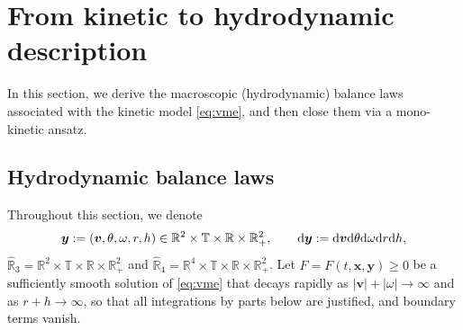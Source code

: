 \documentclass[a4paper,11pt]{article}
\numberwithin{equation}{section}
\theoremstyle{definition}
\newcommand{\bfx}{\boldsymbol{x}}
\newcommand{\bfy}{\boldsymbol{y}}
\newcommand{\bfv}{\boldsymbol{v}}
\newcommand{\bbr}{\mathbb R}
\def\d{{  \rm d}}
\begin{document}
\section{From kinetic to hydrodynamic description} \label{sec:hmodel}

In this section, we derive the macroscopic (hydrodynamic) balance laws associated with the kinetic model
\eqref{eq:vme}, and then close them via a mono-kinetic ansatz.

\subsection{Hydrodynamic balance laws}\label{sec:hblaw}
Throughout this section, we denote
\[
\bfy := (\bfv,\theta,\omega,r,h)\in \bbr^2\times\mathbb{T} \times \bbr \times \bbr_+^2,
\qquad
\d\bfy := \d\bfv \d\theta \d\omega \d r \d h,
\]
$\hat{\bbr}_3 = \bbr^2\times\mathbb{T} \times \bbr \times \bbr_+^2$ and 
$\hat{\bbr}_4 = \bbr^4\times\mathbb{T} \times \bbr \times \bbr_+^2$.
Let $F=F(t,\bfx,\bfy)\ge 0$ be a sufficiently smooth solution of \eqref{eq:vme} that decays rapidly as $|\bfv|+|\omega| \to\infty$ and as $r+h\to\infty$, so that all integrations by parts below are justified, and boundary terms vanish.
\end{document}
